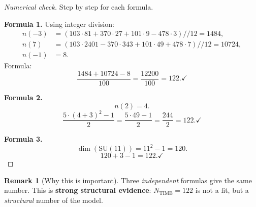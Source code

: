 \documentclass[11pt,a4paper]{article}
\newcommand{\SU}{\mathrm{SU}}
\theoremstyle{definition}
\newtheorem{remark}[theorem]{Remark}
\begin{document}
\begin{proof}[Numerical check]
Step by step for each formula.

\medskip\noindent
\textbf{Formula 1.} Using integer division:
\begin{align}
    n(-3) &= (103 \cdot 81 + 370 \cdot 27 + 101 \cdot 9 
    - 478 \cdot 3) // 12 = 1484, \\
    n(7) &= (103 \cdot 2401 - 370 \cdot 343 + 101 \cdot 49 
    + 478 \cdot 7) // 12 = 10724, \\
    n(-1) &= 8.
\end{align}
Formula:
\begin{equation}
    \frac{1484 + 10724 - 8}{100} = \frac{12200}{100} = 122. \checkmark
\end{equation}

\medskip\noindent
\textbf{Formula 2.}
\begin{equation}
    n(2) = 4.
\end{equation}
\begin{equation}
    \frac{5 \cdot (4 + 3)^2 - 1}{2} = \frac{5 \cdot 49 - 1}{2} 
    = \frac{244}{2} = 122. \checkmark
\end{equation}

\medskip\noindent
\textbf{Formula 3.}
\begin{equation}
    \dim(\SU(11)) = 11^2 - 1 = 120.
\end{equation}
\begin{equation}
    120 + 3 - 1 = 122. \checkmark
\end{equation}
\end{proof}

\begin{remark}[Why this is important]
\label{rem:ntime-important}
Three \emph{independent} formulas give the same number. This is 
\textbf{strong structural evidence}: $N_{\text{TIME}} = 122$ is 
not a fit, but a \emph{structural} number of the model.
\end{remark}
\end{document}
